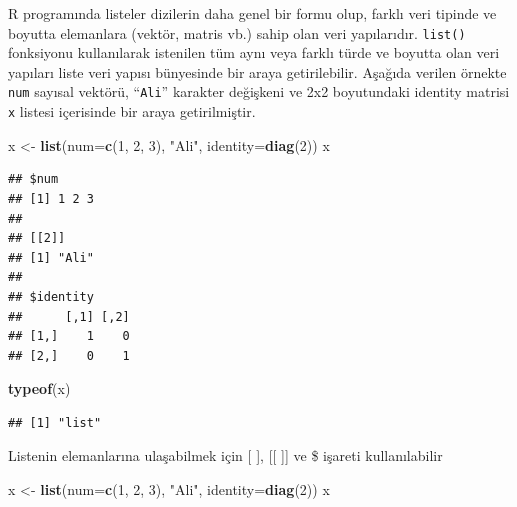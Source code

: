 \documentclass[
]{book}
\newenvironment{Shaded}{\begin{snugshade}}{\end{snugshade}}
\newcommand{\AttributeTok}[1]{\textcolor[rgb]{0.13,0.29,0.53}{#1}}
\newcommand{\DecValTok}[1]{\textcolor[rgb]{0.00,0.00,0.81}{#1}}
\newcommand{\FunctionTok}[1]{\textcolor[rgb]{0.13,0.29,0.53}{\textbf{#1}}}
\newcommand{\NormalTok}[1]{#1}
\newcommand{\OtherTok}[1]{\textcolor[rgb]{0.56,0.35,0.01}{#1}}
\newcommand{\StringTok}[1]{\textcolor[rgb]{0.31,0.60,0.02}{#1}}
\begin{document}
R programında listeler dizilerin daha genel bir formu olup, farklı veri tipinde ve boyutta elemanlara (vektör, matris vb.) sahip olan veri yapılarıdır. \texttt{list()} fonksiyonu kullanılarak istenilen tüm aynı veya farklı türde ve boyutta olan veri yapıları liste veri yapısı bünyesinde bir araya getirilebilir. Aşağıda verilen örnekte \texttt{num} sayısal vektörü, ``\texttt{Ali}'' karakter değişkeni ve 2x2 boyutundaki identity matrisi \texttt{x} listesi içerisinde bir araya getirilmiştir.

\begin{Shaded}
\begin{Highlighting}[]
\NormalTok{x }\OtherTok{\textless{}{-}} \FunctionTok{list}\NormalTok{(}\AttributeTok{num=}\FunctionTok{c}\NormalTok{(}\DecValTok{1}\NormalTok{, }\DecValTok{2}\NormalTok{, }\DecValTok{3}\NormalTok{), }\StringTok{"Ali"}\NormalTok{, }\AttributeTok{identity=}\FunctionTok{diag}\NormalTok{(}\DecValTok{2}\NormalTok{)) }
\NormalTok{x}
\end{Highlighting}
\end{Shaded}

\begin{verbatim}
## $num
## [1] 1 2 3
## 
## [[2]]
## [1] "Ali"
## 
## $identity
##      [,1] [,2]
## [1,]    1    0
## [2,]    0    1
\end{verbatim}

\begin{Shaded}
\begin{Highlighting}[]
\FunctionTok{typeof}\NormalTok{(x)}
\end{Highlighting}
\end{Shaded}

\begin{verbatim}
## [1] "list"
\end{verbatim}

Listenin elemanlarına ulaşabilmek için {[} {]}, {[}{[} {]}{]} ve \$ işareti kullanılabilir

\begin{Shaded}
\begin{Highlighting}[]
\NormalTok{x }\OtherTok{\textless{}{-}} \FunctionTok{list}\NormalTok{(}\AttributeTok{num=}\FunctionTok{c}\NormalTok{(}\DecValTok{1}\NormalTok{, }\DecValTok{2}\NormalTok{, }\DecValTok{3}\NormalTok{), }\StringTok{"Ali"}\NormalTok{, }\AttributeTok{identity=}\FunctionTok{diag}\NormalTok{(}\DecValTok{2}\NormalTok{)) }
\NormalTok{x}
\end{Highlighting}
\end{Shaded}
\end{document}
